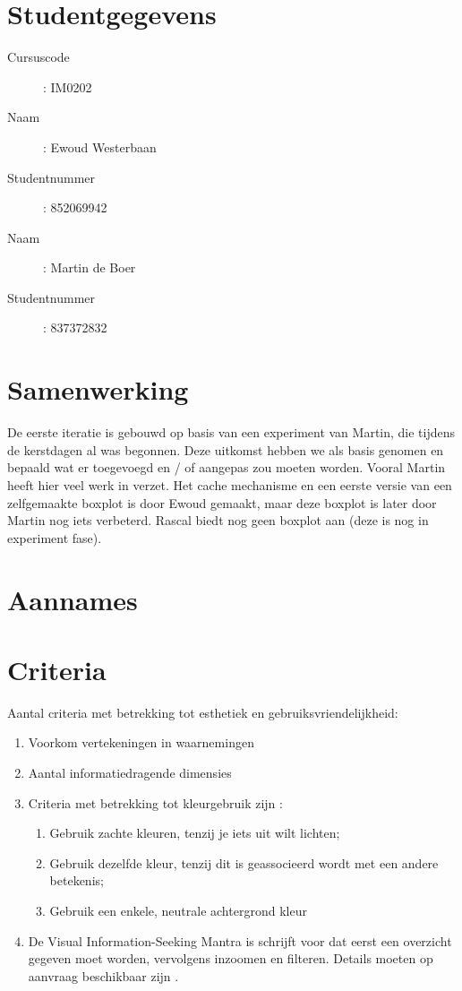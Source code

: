 \documentclass[a4paper]{article}
\begin{document}
\pagestyle{fancy}

\section*{Studentgegevens}
\begin{description}
	\item [Cursuscode]: IM0202
	\item [Naam]: Ewoud Westerbaan
	\item [Studentnummer]: 852069942
	\item [Naam]: Martin de Boer
	\item [Studentnummer]: 837372832
\end{description}

\section{Samenwerking}
De eerste iteratie is gebouwd op basis van een experiment van Martin, die tijdens de kerstdagen al was begonnen. Deze uitkomst hebben we als basis genomen en bepaald wat er toegevoegd en / of aangepas zou moeten worden. Vooral Martin heeft hier veel werk in verzet.
Het cache mechanisme en een eerste versie van een zelfgemaakte boxplot is door Ewoud gemaakt, maar deze boxplot is later door Martin nog iets verbeterd. Rascal biedt nog geen boxplot aan (deze is nog in experiment fase).


\section{Aannames}


\section{Criteria}
Aantal criteria met betrekking tot esthetiek en gebruiksvriendelijkheid:
\begin{enumerate}
\item Voorkom vertekeningen in waarnemingen \cite{tufte2014visual}
\item Aantal informatiedragende dimensies \cite{tufte2014visual}

\item Criteria met betrekking tot kleurgebruik zijn \cite{B}:
\begin{enumerate}
\item Gebruik zachte kleuren, tenzij je iets uit wilt lichten;
\item Gebruik dezelfde kleur, tenzij dit is geassocieerd wordt met een andere betekenis;
\item Gebruik een enkele, neutrale achtergrond kleur
\end{enumerate}


\item De Visual Information-Seeking Mantra is schrijft voor dat eerst een overzicht gegeven moet worden, vervolgens inzoomen en filteren. Details moeten op aanvraag beschikbaar zijn \cite{A}.
\end{enumerate}
\end{document}
